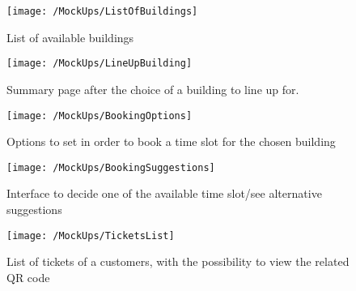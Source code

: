 \begin{figure}[H]
	\centering
	\texttt{[image: /MockUps/ListOfBuildings]}
	\caption{List of available buildings}
\end{figure}

\newpage

\begin{figure}[H]
	\centering
	\texttt{[image: /MockUps/LineUpBuilding]}
	\caption{Summary page after the choice of a building to line up for.}
\end{figure}

\begin{figure}[H]
	\centering
	\texttt{[image: /MockUps/BookingOptions]}
	\caption{Options to set in order to book a time slot for the chosen building}
\end{figure}

\newpage

\begin{figure}[H]
	\centering
	\texttt{[image: /MockUps/BookingSuggestions]}
	\caption{Interface to decide one of the available time slot/see alternative suggestions}
\end{figure}

\begin{figure}[H]
	\centering
	\texttt{[image: /MockUps/TicketsList]}
	\caption{List of tickets of a customers, with the possibility to view the related QR code}
\end{figure}
\newpage
